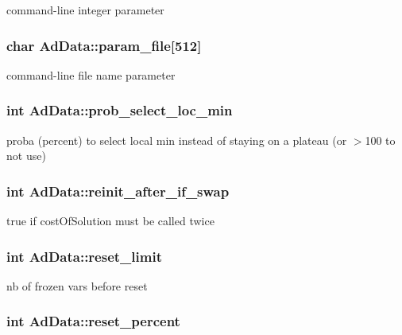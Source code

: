 command-\/line integer parameter \hypertarget{classAdData_a465cda10034a2565c78a565db79b1a45}{
\subsubsection[{param\-\_\-file}]{\setlength{\rightskip}{0pt plus 5cm}char {\bf \-Ad\-Data\-::param\-\_\-file}\mbox{[}512\mbox{]}}}\label{classAdData_a465cda10034a2565c78a565db79b1a45}
command-\/line file name parameter \hypertarget{classAdData_ae3faabad700f63af17109c86e844a479}{
\subsubsection[{prob\-\_\-select\-\_\-loc\-\_\-min}]{\setlength{\rightskip}{0pt plus 5cm}int {\bf \-Ad\-Data\-::prob\-\_\-select\-\_\-loc\-\_\-min}}}\label{classAdData_ae3faabad700f63af17109c86e844a479}
proba (percent) to select local min instead of staying on a plateau (or $>$100 to not use) \hypertarget{classAdData_a0a5bced280616c57eeaf20d78eabd538}{
\subsubsection[{reinit\-\_\-after\-\_\-if\-\_\-swap}]{\setlength{\rightskip}{0pt plus 5cm}int {\bf \-Ad\-Data\-::reinit\-\_\-after\-\_\-if\-\_\-swap}}}\label{classAdData_a0a5bced280616c57eeaf20d78eabd538}
true if cost\-Of\-Solution must be called twice \hypertarget{classAdData_ad412ba14ea9c314cb3628f1f370d3857}{
\subsubsection[{reset\-\_\-limit}]{\setlength{\rightskip}{0pt plus 5cm}int {\bf \-Ad\-Data\-::reset\-\_\-limit}}}\label{classAdData_ad412ba14ea9c314cb3628f1f370d3857}
nb of frozen vars before reset \hypertarget{classAdData_a8a6886ff5569b524eaacd83bdc963cd1}{
\subsubsection[{reset\-\_\-percent}]{\setlength{\rightskip}{0pt plus 5cm}int {\bf \-Ad\-Data\-::reset\-\_\-percent}}}\label{classAdData_a8a6886ff5569b524eaacd83bdc963cd1}
